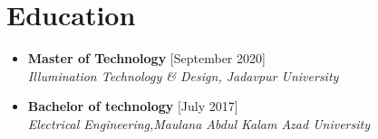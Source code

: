 \documentclass[11pt,a4paper]{moderncv}
\begin{document}
\begin{itemize}
	
\end{itemize}

\section{Education}

\begin{itemize}
	
	\item \textbf{Master of Technology} \hfill [September 2020]\\
	\textit{Illumination Technology \& Design, Jadavpur University}
	
	\item \textbf{Bachelor of technology} \hfill [July 2017]\\
	\textit{Electrical Engineering,Maulana Abdul Kalam Azad University}
	
%	

\end{itemize}
\end{document}

